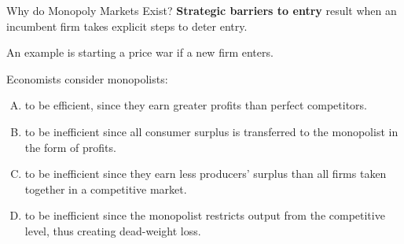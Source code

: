\documentclass[11pt,t]{beamer}
\begin{document}
\begin{frame}{Why do Monopoly Markets Exist?}
  \textbf{Strategic barriers to entry} result when an incumbent firm takes explicit steps to deter entry.

  \bigskip
  An example is starting a price war if a new firm enters.
\end{frame}

\begin{frame}{}
  Economists consider monopolists:

  \begin{enumerate}[A)]
    \item to be efficient, since they earn greater profits than perfect competitors.
    \item to be inefficient since all consumer surplus is transferred to the monopolist in the form of profits.
    \item to be inefficient since they earn less producers' surplus than all firms taken together in a competitive market.
    \item to be inefficient since the monopolist restricts output from the competitive level, thus creating dead-weight loss.
  \end{enumerate}
\end{frame}
\end{document}

